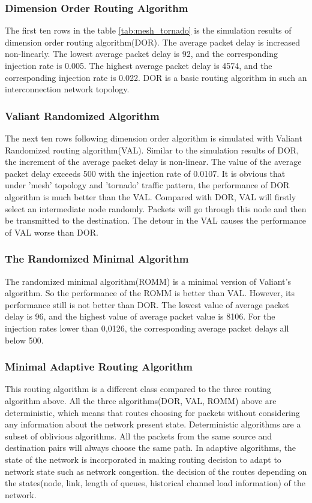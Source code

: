 \subsubsection{Dimension Order Routing Algorithm}
The first ten rows in the table \ref{tab:mesh_tornado} is the simulation results of dimension order routing algorithm(DOR). The average packet delay is increased non-linearly. The lowest average packet delay is 92, and the corresponding injection rate is 0.005. The highest average packet delay is 4574, and the corresponding injection rate is 0.022. DOR is a basic routing algorithm in such an interconnection network topology.

\subsubsection{Valiant Randomized Algorithm}
The next ten rows following dimension order algorithm is simulated with Valiant Randomized routing algorithm(VAL). Similar to the simulation results of DOR, the increment of the average packet delay is non-linear. The value of the average packet delay exceeds 500 with the injection rate of 0.0107. It is obvious that under 'mesh' topology and 'tornado' traffic pattern, the performance of DOR algorithm is much better than the VAL. Compared with DOR, VAL will firstly select an intermediate node randomly. Packets will go through this node and then be transmitted to the destination. The detour in the VAL causes the performance of VAL worse than DOR.

\subsubsection{The Randomized Minimal Algorithm}
The randomized minimal algorithm(ROMM) is a minimal version of Valiant's algorithm. So the performance of the ROMM is better than VAL. However, its performance still is not better than DOR. The lowest value of average packet delay is 96, and the highest value of average packet value is 8106. For the injection rates lower than 0,0126, the corresponding average packet delays all below 500.

\subsubsection{Minimal Adaptive Routing Algorithm}
This routing algorithm is a different class compared to the three routing algorithm above. All the three algorithms(DOR, VAL, ROMM) above are deterministic, which means that routes choosing for packets without considering any information about the network present state. Deterministic algorithms are a subset of oblivious algorithms. All the packets from the same source and destination pairs will always choose the same path. In adaptive algorithms, the state of the network is incorporated in making routing decision to adapt to network state such as network congestion. the decision of the routes depending on the states(node, link, length of queues, historical channel load information) of the network.

